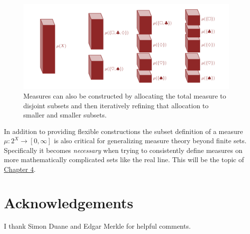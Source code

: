 \documentclass[
  letterpaper,
  DIV=11,
  numbers=noendperiod]{scrartcl}
\begin{document}
\begin{figure}

{\centering \includegraphics[width=1\textwidth,height=\textheight]{figures/decompositions/refinement/refinement.pdf}

}

\caption{\label{fig-refinement}Measures can also be constructed by
allocating the total measure to disjoint subsets and then iteratively
refining that allocation to smaller and smaller subsets.}

\end{figure}

In addition to providing flexible constructions the subset definition of
a measure \(\mu : 2^{X} \rightarrow [0, \infty]\) is also critical for
generalizing measure theory beyond finite sets. Specifically it becomes
\emph{necessary} when trying to consistently define measures on more
mathematically complicated sets like the real line. This will be the
topic of
\href{https://betanalpha.github.io/assets/chapters_html/probability_on_general_spaces.html}{Chapter
4}.

\hypertarget{acknowledgements}{%
\section{Acknowledgements}\label{acknowledgements}}

I thank Simon Duane and Edgar Merkle for helpful comments.
\end{document}
